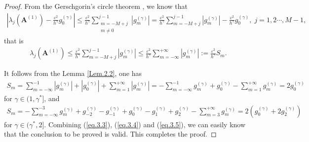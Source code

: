 \documentclass{siamart171218}
\numberwithin{theorem}{section}
\numberwithin{equation}{section}
\begin{document}
\begin{proof}
From the Gerschgorin’s circle theorem \cite{Kincaid1991}, we know that
\begin{equation*}
\begin{aligned}
\displaystyle
\left|\lambda_j\left({\mathbf{A}}^{(1)}\right)
-\frac{\varepsilon^2}{h^\gamma}g_0^{(\gamma)}\right|\leq
\frac{\varepsilon^2}{h^\gamma}\sum_{\substack{m=-M+j\\m\neq0}}^{j-1}\left|g_m^{(\gamma)}\right|
=\frac{\varepsilon^2}{h^\gamma}\sum_{m=-M+j}^{j-1}\left|g_m^{(\gamma)}\right|
-\frac{\varepsilon^2}{h^\gamma}g_0^{(\gamma)},
\;j=1,2\cdots,M-1,
\end{aligned}
\end{equation*}
that is
\begin{equation}\label{eq.3.3}
\begin{aligned}
\displaystyle
\lambda_j\left({\mathbf{A}}^{(1)}\right)
\leq\frac{\varepsilon^2}{h^\gamma}\sum_{m=-M+j}^{j-1}\left|g_m^{(\gamma)}\right|\leq
\frac{\varepsilon^2}{h^\gamma}\sum_{m=-\infty}^{+\infty}\left|g_m^{(\gamma)}\right|
:=\frac{\varepsilon^2}{h^\gamma}S_m.
\end{aligned}
\end{equation}

It follows from the Lemma \ref{Lem.2.2}, one has
\begin{equation}\label{eq.3.4}
\begin{aligned}
\displaystyle
S_m
=\sum_{m=-\infty}^{-1}\left|g_m^{(\gamma)}\right|
+\left|g_{0}^{(\gamma)}\right|
+\sum_{m=1}^{+\infty}\left|g_m^{(\gamma)}\right|
=-\sum_{m=-\infty}^{-1}g_m^{(\gamma)}
+g_{0}^{(\gamma)}
-\sum_{m=1}^{+\infty}g_m^{(\gamma)}=2g_{0}^{(\gamma)}
\end{aligned}
\end{equation}
for $\gamma\in(1,\gamma^{*}]$, and
\begin{equation}\label{eq.3.5}
\begin{aligned}
\displaystyle
S_m
=-\sum_{m=-\infty}^{-3}g_m^{(\gamma)}
+g_{-2}^{(\gamma)}-g_{-1}^{(\gamma)}+g_{0}^{(\gamma)}
-g_{1}^{(\gamma)}+g_{2}^{(\gamma)}
-\sum_{m=3}^{+\infty}g_m^{(\gamma)}
=2\left(g_{0}^{(\gamma)}+2g_{2}^{(\gamma)}\right)
\end{aligned}
\end{equation}
for $\gamma\in(\gamma^{*},2]$.
Combining (\ref{eq.3.3}), (\ref{eq.3.4}) and (\ref{eq.3.5}), we can easily know that the
conclusion to be proved is valid.
 This completes the proof.
\end{proof}
\end{document}

